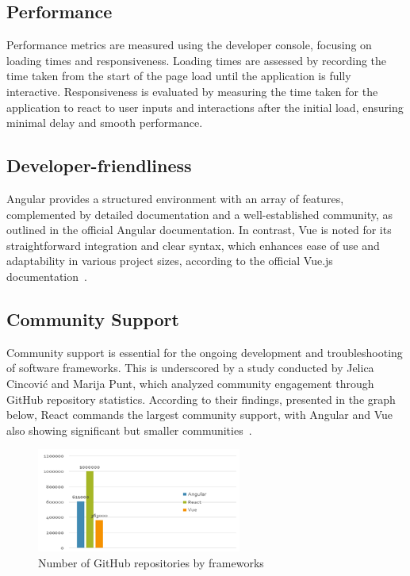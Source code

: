 \subsection{Performance}
Performance metrics are measured using the developer console, focusing on loading times and responsiveness. Loading times are assessed by recording the time taken from the start of the page load until the application is fully interactive. Responsiveness is evaluated by measuring the time taken for the application to react to user inputs and interactions after the initial load, ensuring minimal delay and smooth performance.
\subsection{Developer-friendliness}
Angular provides a structured environment with an array of features, complemented by detailed documentation and a well-established community, as outlined in the official Angular documentation. In contrast, Vue is noted for its straightforward integration and clear syntax, which enhances ease of use and adaptability in various project sizes, according to the official Vue.js documentation~\cite{angular, vue}.

\subsection{Community Support}
Community support is essential for the ongoing development and troubleshooting of software frameworks. This is underscored by a study conducted by Jelica Cincović and Marija Punt, which analyzed community engagement through GitHub repository statistics. According to their findings, presented in the graph below, React commands the largest community support, with Angular and Vue also showing significant but smaller communities~\cite{cincovic2020comparison}.

\begin{figure}[h!]
    \centering
    \includegraphics[width=0.6\textwidth]{image.png}
    \caption{Number of GitHub repositories by frameworks~\cite{cincovic2020comparison}}
    \label{fig:github_repos}
\end{figure}
    
